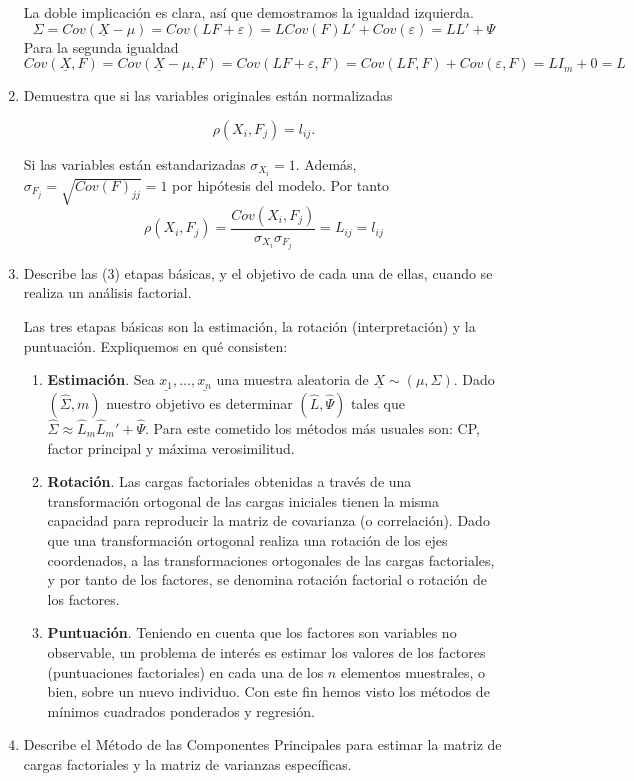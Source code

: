 \documentclass[twoside]{article}
\newcommand{\muestra}[1]{{\underline{#1}}}
\newcommand{\mX}{{\muestra{X}}}
\begin{document}
\begin{enumerate}
La doble implicación es clara, así que demostramos la igualdad izquierda.
$$
\Sigma = Cov(\mX-\mu) = Cov(LF+\varepsilon) = LCov(F)L' + Cov(\varepsilon) = LL'+\Psi
$$
Para la segunda igualdad
$$
Cov(\mX,F) = Cov(\mX-\mu,F) = Cov(LF+\varepsilon,F) = Cov(LF,F)+Cov(\varepsilon,F) = LI_m + 0 = L
$$
\item Demuestra que si las variables originales están normalizadas

\[ \rho(X_i, F_j) = l_{ij}. \]

Si las variables están estandarizadas ${\sigma}_{X_i}=1$. Además, $\sigma_{F_j}=\sqrt{Cov(F)_{jj}} = 1$ por hipótesis del modelo. Por tanto
$$
\rho(X_i,F_j) = \frac{Cov(X_i,F_j)}{\sigma_{X_i}\sigma_{F_j}} = L_{ij} = l_{ij}
$$
\item Describe las (3) etapas básicas, y el objetivo de cada una de ellas, cuando se realiza un análisis factorial.

Las tres etapas básicas son la estimación, la rotación (interpretación) y la puntuación. Expliquemos en qué consisten:

\begin{enumerate}
\item \textbf{Estimación}. Sea $\muestra{x_1},\dotsc,\muestra{x_n}$ una muestra aleatoria de $\mX\sim (\mu,\Sigma)$. Dado $(\hat{\Sigma},m)$ nuestro objetivo es determinar $(\hat{L},\hat{\Psi})$ tales que $\hat{\Sigma}\approx \hat{L}_m\hat{L}_m'+\hat{\Psi}$. Para este cometido los métodos más usuales son: CP, factor principal y máxima verosimilitud.
\item \textbf{Rotación}. Las cargas factoriales obtenidas a través de una transformación ortogonal de las cargas iniciales tienen la misma capacidad para reproducir la matriz de covarianza (o correlación). Dado que una transformación ortogonal realiza una rotación de los ejes coordenados, a las transformaciones ortogonales de las cargas factoriales, y por tanto de los factores, se denomina rotación factorial o rotación de los factores.

\item \textbf{Puntuación}. Teniendo en cuenta que los factores son variables no observable, un problema de interés
es estimar los valores de los factores (puntuaciones factoriales) en cada una de los $n$ elementos muestrales, o bien, sobre un nuevo individuo. Con este fin hemos visto los métodos de mínimos cuadrados ponderados y regresión.
\end{enumerate}

\item Describe el Método de las Componentes Principales para estimar la matriz de cargas factoriales y la matriz de varianzas específicas.


\end{enumerate}
\end{document}
